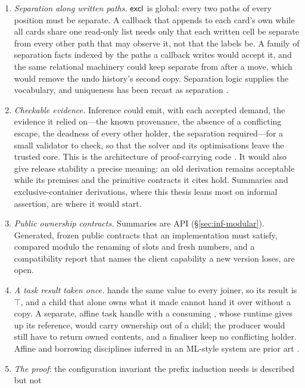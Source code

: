 \begin{enumerate}
premises, and the premise T59 shows missing would have to be stated to be used.
\item \emph{Separation along written paths.} $\mathsf{excl}$ is global: every two paths of every position must be
separate. A callback that appends to each card's own  while all cards share one read-only
 list needs only that each written cell be separate from every other path that may observe
it, not that the labels be. A family of separation facts indexed by the paths a callback writes would
accept it, and the same relational machinery could keep  separate from
 after a move, which would remove the undo history's second copy. Separation logic
supplies the vocabulary, and uniqueness has been recast as separation \citep{oconnor2026separation}.
\item \emph{Checkable evidence.} Inference could emit, with each accepted demand, the evidence it relied
on---the known provenance, the absence of a conflicting escape, the deadness of every other holder, the
separation required---for a small validator to check, so that the solver and its optimisations leave the
trusted core. This is the architecture of proof-carrying code \citep{necula2002untrusted}. It would also
give release stability a precise meaning: an old derivation remains acceptable while its premises and the
primitive contracts it cites hold. Summaries and exclusive-container derivations, where this thesis leans
most on informal assertion, are where it would start.
\item \emph{Public ownership contracts.} Summaries are API (\S\ref{sec:inf-modular}). Generated, frozen
public contracts that an implementation must satisfy, compared modulo the renaming of slots and fresh
numbers, and a compatibility report that names the client capability a new version loses, are open.
\item \emph{A task result taken once.}  hands the same value to every joiner, so its result
is $\top$, and a child that alone owns what it made cannot hand it over without a copy. A separate,
affine task handle with a consuming , whose runtime gives up its reference, would carry
ownership out of a child; the producer would still have to return owned contents, and a finaliser keep
no conflicting holder. Affine and borrowing disciplines inferred in an ML-style system are prior art
\citep{radanne2020kindly}.
\item \emph{The proof}: the configuration invariant the prefix induction needs is described but not

\end{enumerate}
